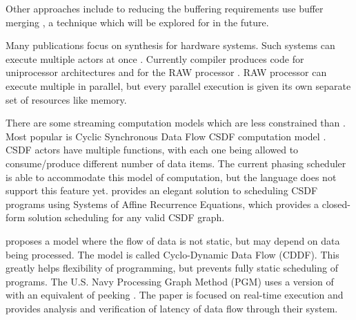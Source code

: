 Other approaches include to reducing the buffering requirements
use buffer merging \cite{murthy99buffer}, a technique which will
be explored for {\StreamIt} in the future.

Many publications focus on synthesis for hardware systems.  Such
systems can execute multiple actors at once
\cite{govindarajan-minimizing}.  Currently {\StreamIt} compiler
produces code for uniprocessor architectures \cite{streamittech2}
and for the RAW processor \cite{gordo-thesis}.  RAW processor can
execute multiple {\filters} in parallel, but every parallel
execution is given its own separate set of resources like memory.

There are some streaming computation models which are less
constrained than {\SDF}. Most popular is Cyclic Synchronous Data Flow
CSDF computation model \cite{parks95comparison}.  CSDF actors have
multiple {\work} functions, with each one being allowed to
consume/produce different number of data items. The current
{\StreamIt} phasing scheduler is able to accommodate this model of
computation, but the {\StreamIt} language does not support this
feature yet. \cite{streamittech3} provides an elegant solution to
scheduling CSDF programs using Systems of Affine Recurrence
Equations, which provides a closed-form solution scheduling for
any valid CSDF graph.

\cite{wauters96cyclodynamic} proposes a model where the flow of
data is not static, but may depend on data being processed. The
model is called Cyclo-Dynamic Data Flow (CDDF). This greatly helps
flexibility of programming, but prevents fully static scheduling
of programs. The U.S. Navy Processing Graph Method (PGM) uses a
version of {\SDF} with an equivalent of peeking \cite{goddard00navy}.
The paper is focused on real-time execution and provides analysis
and verification of latency of data flow through their system.

